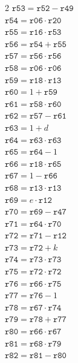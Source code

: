\documentclass[10pt]{article}
\begin{document}
\begin{multicols}{2}
\(\mathtt{r53} = \mathtt{r52} - \mathtt{r49}\)\\
\(\mathtt{r54} = \mathtt{r06} \cdot \mathtt{r20}\)\\
\(\mathtt{r55} = \mathtt{r16} \cdot \mathtt{r53}\)\\
\(\mathtt{r56} = \mathtt{r54} + \mathtt{r55}\)\\
\(\mathtt{r57} = \mathtt{r56} \cdot \mathtt{r56}\)\\
\(\mathtt{r58} = \mathtt{r06} \cdot \mathtt{r06}\)\\
\(\mathtt{r59} = \mathtt{r18} \cdot \mathtt{r13}\)\\
\(\mathtt{r60} = 1 + \mathtt{r59}\)\\
\(\mathtt{r61} = \mathtt{r58} \cdot \mathtt{r60}\)\\
\(\mathtt{r62} = \mathtt{r57} - \mathtt{r61}\)\\
\(\mathtt{r63} = 1 + d\)\\
\(\mathtt{r64} = \mathtt{r63} \cdot \mathtt{r63}\)\\
\(\mathtt{r65} = \mathtt{r64} - 1\)\\
\(\mathtt{r66} = \mathtt{r18} \cdot \mathtt{r65}\)\\
\(\mathtt{r67} = 1 - \mathtt{r66}\)\\
\(\mathtt{r68} = \mathtt{r13} \cdot \mathtt{r13}\)\\
\(\mathtt{r69} = e \cdot \mathtt{r12}\)\\
\(\mathtt{r70} = \mathtt{r69} - \mathtt{r47}\)\\
\(\mathtt{r71} = \mathtt{r64} \cdot \mathtt{r70}\)\\
\(\mathtt{r72} = \mathtt{r71} - \mathtt{r12}\)\\
\(\mathtt{r73} = \mathtt{r72} + k\)\\
\(\mathtt{r74} = \mathtt{r73} \cdot \mathtt{r73}\)\\
\(\mathtt{r75} = \mathtt{r72} \cdot \mathtt{r72}\)\\
\(\mathtt{r76} = \mathtt{r66} \cdot \mathtt{r75}\)\\
\(\mathtt{r77} = \mathtt{r76} - 1\)\\
\(\mathtt{r78} = \mathtt{r67} \cdot \mathtt{r74}\)\\
\(\mathtt{r79} = \mathtt{r78} + \mathtt{r77}\)\\
\(\mathtt{r80} = \mathtt{r66} \cdot \mathtt{r67}\)\\
\(\mathtt{r81} = \mathtt{r68} \cdot \mathtt{r79}\)\\
\(\mathtt{r82} = \mathtt{r81} - \mathtt{r80}\)\\

\end{multicols}
\end{document}
